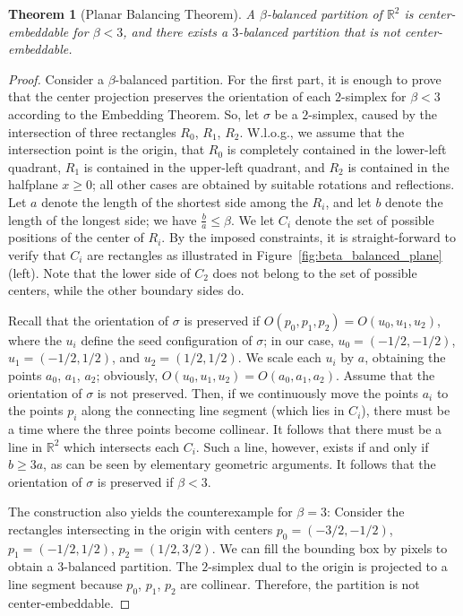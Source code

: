 \documentclass[12pt]{article}
\newcommand{\R}{\mathbb{R}}
\newcommand{\orient}{O}
\newtheorem{theorem}{Theorem}
\begin{document}
\begin{theorem}[Planar Balancing Theorem]\label{thm:planar_balancing}
A $\beta$-balanced partition of $\R^2$ is center-embeddable for $\beta<3$, and
there exists a $3$-balanced partition that is not center-embeddable.
\end{theorem}
\begin{proof}
Consider a $\beta$-balanced partition. For the first part, it is enough to prove that the center projection
preserves the orientation of each $2$-simplex for $\beta<3$ according to the Embedding Theorem.
So, let $\sigma$ be a $2$-simplex, caused by the intersection of three rectangles $R_0$, $R_1$,
$R_2$. W.l.o.g., we assume that the intersection point is the origin, that $R_0$ is completely
contained in the lower-left quadrant, $R_1$ is contained in the upper-left quadrant,
and $R_2$ is contained in the halfplane $x\geq 0$; all other cases are obtained by 
suitable rotations and reflections. Let $a$ denote the length of the shortest side
among the $R_i$, and let $b$ denote the length of the longest side; we have $\frac{b}{a}\leq\beta$.
We let $C_i$ denote the set of possible positions of the center of $R_i$. 
By the imposed constraints, it is straight-forward to verify that $C_i$
are rectangles as illustrated in Figure~\ref{fig:beta_balanced_plane} (left).
Note that the lower side of $C_2$ does not belong to the set of possible centers,
while the other boundary sides do.

Recall that the orientation of $\sigma$ is preserved if
$\orient(p_0,p_1,p_2)=\orient(u_0,u_1,u_2)$, where the $u_i$ define the seed configuration
of $\sigma$; in our case, $u_0=(-1/2,-1/2)$, $u_1=(-1/2,1/2)$, and $u_2=(1/2,1/2)$.
We scale each $u_i$ by $a$, obtaining the points $a_0$, $a_1$, $a_2$; 
obviously, $\orient(u_0,u_1,u_2)=\orient(a_0,a_1,a_2)$.
Assume that the orientation of $\sigma$ is not preserved.
Then, if we continuously move the points $a_i$ to the points $p_i$ along the
connecting line segment (which lies in $C_i$), there must be a time
where the three points become collinear. 
It follows that there must be a line in $\R^2$ 
which intersects each $C_i$. 
Such a line, however, exists if and only if $b\geq 3a$,
as can be seen by elementary geometric arguments.
It follows that the orientation of $\sigma$ is preserved if $\beta<3$.

The construction also yields the counterexample for $\beta=3$: Consider the rectangles
intersecting in the origin with centers
$p_0=(-3/2,-1/2)$, $p_1=(-1/2,1/2)$, $p_2=(1/2,3/2)$. We can fill the bounding box
by pixels to obtain a $3$-balanced partition. The $2$-simplex dual to the origin
is projected to a line segment because $p_0$, $p_1$, $p_2$ are collinear. Therefore,
the partition is not center-embeddable.
\end{proof}
\end{document}
